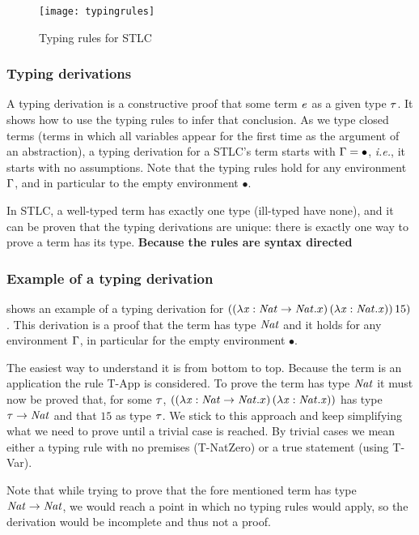 \begin{figure}
  \centering
  \texttt{[image: typingrules]}
  \caption{Typing rules for STLC}
  \label{STLC typing}
\end{figure}
\subsubsection{Typing derivations}
A typing derivation is a constructive proof that some term $\mathit{e}$ as a given type $\mathit{\tau}$. It shows how to use the typing rules to infer that conclusion. As we type closed terms (terms in which all variables appear for the first time as the argument of an abstraction), a typing derivation for a STLC's term starts with $\Gamma=\bullet$, \textit{i.e.}, it starts with no assumptions. Note that the typing rules hold for any environment $\Gamma$, and in particular to the empty environment $\bullet$.

In STLC, a well-typed term has exactly one type (ill-typed have none), and it can be proven that the typing derivations are unique: there is exactly one way to prove a term has its type. \textbf{Because the rules are syntax directed}

\subsubsection{Example of a typing derivation}
 shows an example of a typing derivation for $((\lambda \mathit{x}: \mathit{Nat} \rightarrow \mathit{Nat}.x) \, (\lambda \mathit{x}:\mathit{Nat}.\mathit{x}))\,15)$. This derivation is a proof that the term has type $\mathit{Nat}$ and it holds for any environment $\Gamma$, in particular for the empty environment $\bullet$.

The easiest way to understand it is from bottom to top. Because the term is an application the rule T-App is considered. To prove the term has type $\mathit{Nat}$ it must now be proved that, for some $\mathit{\tau}$, $((\lambda \mathit{x}: \mathit{Nat} \rightarrow \mathit{Nat}.x) \, (\lambda \mathit{x}:\mathit{Nat}.\mathit{x}))$ has type $\mathit{\tau} \rightarrow \mathit{Nat}$ and that $15$ as type $\mathit{\tau}$. We stick to this approach and keep simplifying what we need to prove until a trivial case is reached. By trivial cases we mean either a typing rule with no premises (T-NatZero) or a true statement (using T-Var).

Note that while trying to prove that the fore mentioned term has type $\mathit{Nat} \rightarrow \mathit{Nat}$, we would reach a point in which no typing rules would apply, so the derivation would be incomplete and thus not a proof.

